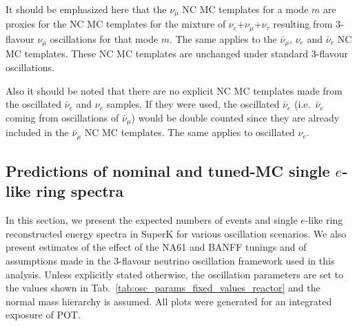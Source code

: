 It should be emphasized here that
the $\nu_{\mu}$ NC MC templates for a mode $m$ are proxies for the
NC MC templates for the mixture of $\nu_{e}$+$\nu_{\mu}$+$\nu_{\tau}$ resulting from
3-flavour $\nu_{\mu}$ oscillations for that mode $m$. The same applies to the $\bar{\nu}_{\mu}$, $\nu_{e}$ and $\bar{\nu}_{e}$ 
NC MC templates. These NC MC templates are unchanged under standard 3-flavour oscillations.%

Also it should be noted that there are no explicit NC MC templates made from the oscillated $\bar{\nu}_{e}$ and $\nu_{e}$ 
samples. If they were used, the oscillated $\bar{\nu}_{e}$ (i.e.\ $\bar{\nu}_{e}$ coming from oscillations of $\bar{\nu}_{\mu}$) 
would be double counted since they are already included in the $\bar{\nu}_{\mu}$ NC MC templates. The same applies to oscillated 
$\nu_{e}$.


\subsection {Predictions of nominal and tuned-MC single $e$-like ring spectra}
\label{sec:nominal_and_tuned_predictions}

In this section, we present the expected numbers of events and single $e$-like ring reconstructed energy spectra in SuperK 
for various oscillation scenarios. We also present estimates of the effect of the NA61 and BANFF tunings and of assumptions 
made in the 3-flavour neutrino oscillation framework used in this analysis. Unless explicitly stated otherwise, the oscillation 
parameters are set to the values shown in Tab.~\ref{tab:osc_params_fixed_values_reactor} and the normal mass hierarchy is assumed.
All plots were generated for an integrated exposure of \TotalPot POT.


